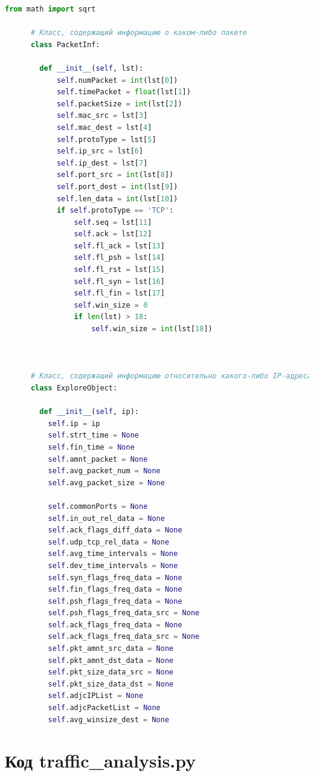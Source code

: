 \documentclass[bachelor, och, coursework]{SCWorks}
\begin{document}
    \begin{lstlisting}[language=Python]
      from math import sqrt

      # Класс, содержащий информацию о каком-либо пакете
      class PacketInf:
      
        def __init__(self, lst):
            self.numPacket = int(lst[0])
            self.timePacket = float(lst[1])
            self.packetSize = int(lst[2])
            self.mac_src = lst[3]
            self.mac_dest = lst[4]
            self.protoType = lst[5]
            self.ip_src = lst[6]
            self.ip_dest = lst[7]
            self.port_src = int(lst[8])
            self.port_dest = int(lst[9])
            self.len_data = int(lst[10])
            if self.protoType == 'TCP':
                self.seq = lst[11]
                self.ack = lst[12]
                self.fl_ack = lst[13]
                self.fl_psh = lst[14]
                self.fl_rst = lst[15]
                self.fl_syn = lst[16]
                self.fl_fin = lst[17]
                self.win_size = 0
                if len(lst) > 18:
                    self.win_size = int(lst[18])
      
      
      
      # Класс, содержащий информацию относительно какого-либо IP-адреса
      class ExploreObject:
      
        def __init__(self, ip):
          self.ip = ip
          self.strt_time = None
          self.fin_time = None
          self.amnt_packet = None
          self.avg_packet_num = None
          self.avg_packet_size = None
      
          self.commonPorts = None
          self.in_out_rel_data = None
          self.ack_flags_diff_data = None
          self.udp_tcp_rel_data = None
          self.avg_time_intervals = None
          self.dev_time_intervals = None
          self.syn_flags_freq_data = None
          self.fin_flags_freq_data = None
          self.psh_flags_freq_data = None
          self.psh_flags_freq_data_src = None
          self.ack_flags_freq_data = None
          self.ack_flags_freq_data_src = None
          self.pkt_amnt_src_data = None
          self.pkt_amnt_dst_data = None
          self.pkt_size_data_src = None
          self.pkt_size_data_dst = None
          self.adjcIPList = None
          self.adjcPacketList = None
          self.avg_winsize_dest = None
    \end{lstlisting}

    \section{Код traffic\_analysis.py}
\end{document}
